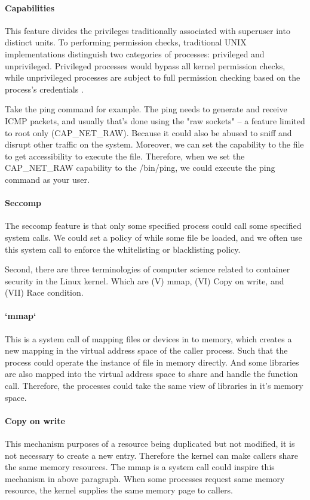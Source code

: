 \documentclass[12pt,a4paper]{article}
\begin{document}
\paragraph{Capabilities}
This feature divides the privileges traditionally associated with superuser into
distinct units. To performing permission checks, traditional UNIX
implementations distinguish two categories of processes: privileged and unprivileged.
Privileged processes would bypass all kernel permission checks, while unprivileged
processes are subject to full permission checking based on the process's credentials
\cite{capabilities}.

Take the ping command for example. The ping needs to generate and receive ICMP packets,
and usually that's done using the "raw sockets" – a feature limited to root only
(CAP\_NET\_RAW). Because it could also be abused to sniff and disrupt other traffic
on the system. Moreover, we can set the capability to the file to get accessibility
to execute the file.
Therefore, when we set the CAP\_NET\_RAW capability to the /bin/ping, we could execute
the ping command as your user.

\paragraph{Seccomp}
The seccomp feature is that only some specified process could call some specified
system calls. We could set a policy of while some file be loaded, and we often use
this system call to enforce the whitelisting or blacklisting policy.

Second, there are three terminologies of computer science related to container
security in the Linux kernel. Which are (\RN{5}) mmap, (\RN{6}) Copy on write,
and (\RN{7}) Race condition.

\paragraph{`mmap`}
This is a system call of mapping files or devices in to memory, which creates a
new mapping in the virtual address space of the caller process. Such that
the process could operate the instance of file in memory directly.
And some libraries are also mapped into the virtual address space to share and handle
the function call. Therefore, the processes could take the same view of libraries in
it's memory space.

\paragraph{Copy on write}
This mechanism purposes of a resource being duplicated but not modified, it is not
necessary to create a new entry. Therefore the kernel can make callers share
the same memory resources. The mmap is a system call could inspire this mechanism
in above paragraph. When some processes request same memory resource, the kernel
supplies the same memory page to callers.
\end{document}
